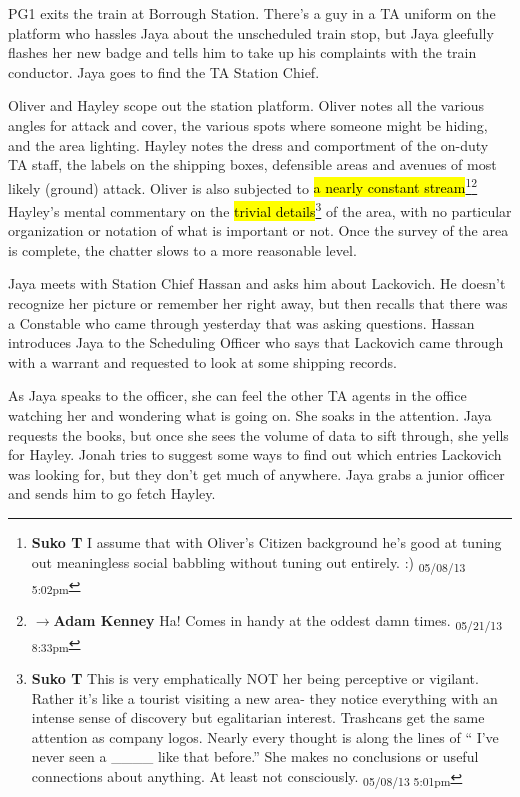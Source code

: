 PG1 exits the train at Borrough Station.  There's a guy in a TA uniform on the platform who hassles Jaya about the unscheduled train stop, but Jaya gleefully flashes her new badge and tells him to take up his complaints with the train conductor.  Jaya goes to find the TA Station Chief.



Oliver and Hayley scope out the station platform.  Oliver notes all the various angles for attack and cover, the various spots where someone might be hiding, and the area lighting.  Hayley notes the dress and comportment of the on-duty TA staff, the labels on the shipping boxes, defensible areas and avenues of most likely (ground) attack.  Oliver is also subjected to \hl{a nearly constant stream}\footnote{\textbf{Suko T }I assume that with Oliver's Citizen background he's good at tuning out meaningless social babbling without tuning out entirely. :) \textsubscript{05/08/13 5:02pm}}\footnote{$\rightarrow$\textbf{Adam Kenney }Ha!  Comes in handy at the oddest damn times. \textsubscript{05/21/13 8:33pm}} Hayley's mental commentary on the \hl{trivial details}\footnote{\textbf{Suko T }This is very emphatically NOT her being perceptive or vigilant.  Rather it's like a tourist visiting a new area- they notice everything with an intense sense of discovery but egalitarian interest.  Trashcans get the same attention as company logos.  Nearly every thought is along the lines of `` I've never seen a \_\_\_\_ like that before.''   She makes no conclusions or useful connections about anything.  At least not consciously. \textsubscript{05/08/13 5:01pm}} of the area, with no particular organization or notation of what is important or not.  Once the survey of the area is complete, the chatter slows to a more reasonable level.



Jaya meets with Station Chief Hassan and asks him about Lackovich.  He doesn't recognize her picture or remember her right away, but then recalls that there was a Constable who came through yesterday that was asking questions.  Hassan introduces Jaya to the Scheduling Officer who says that Lackovich came through with a warrant and requested to look at some shipping records.



As Jaya speaks to the officer, she can feel the other TA agents in the office watching her and wondering what is going on.  She soaks in the attention.  Jaya requests the books, but once she sees the volume of data to sift through, she yells for Hayley.  Jonah tries to suggest some ways to find out which entries Lackovich was looking for, but they don't get much of anywhere.  Jaya grabs a junior officer and sends him to go fetch Hayley.



